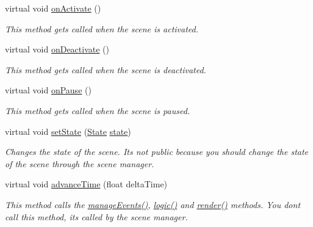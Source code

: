 \begin{DoxyCompactItemize}
\item 
virtual void \hyperlink{classzt_1_1_scene_a45f434d305b61e9819fb21efe35189dc}{on\+Activate} ()
\begin{DoxyCompactList}\small\item\em This method gets called when the scene is activated. \end{DoxyCompactList}\item 
virtual void \hyperlink{classzt_1_1_scene_a58390d4649c7c0eda1a3fe2f65952a3f}{on\+Deactivate} ()
\begin{DoxyCompactList}\small\item\em This method gets called when the scene is deactivated. \end{DoxyCompactList}\item 
virtual void \hyperlink{classzt_1_1_scene_a38821456606a61abb6255fed9954336e}{on\+Pause} ()
\begin{DoxyCompactList}\small\item\em This method gets called when the scene is paused. \end{DoxyCompactList}\item 
virtual void \hyperlink{classzt_1_1_scene_a0a0d32e948aca8f581a771f54a4444e5}{set\+State} (\hyperlink{classzt_1_1_scene_a5618d9448cd874af20a6be8ed60c87a5}{State} \hyperlink{classzt_1_1_scene_afa7ec29518dcf41daf6e1b33b3241ff8}{state})
\begin{DoxyCompactList}\small\item\em Changes the state of the scene. It\textquotesingle{}s not public because you should change the state of the scene through the scene manager. \end{DoxyCompactList}\item 
virtual void \hyperlink{classzt_1_1_scene_ac5440bbe62a44eda2d4b3d1dde5d3d6a}{advance\+Time} (float delta\+Time)
\begin{DoxyCompactList}\small\item\em This method calls the \hyperlink{classzt_1_1_scene_ac450fd3460c158c0a3f2661df0410477}{manage\+Events()}, \hyperlink{classzt_1_1_scene_a1150eb60893f3077ecacf94b309414bf}{logic()} and \hyperlink{classzt_1_1_scene_aa554c0468228aa1aab7e553c52c7b0d4}{render()} methods. You don\textquotesingle{}t call this method, it\textquotesingle{}s called by the scene manager. \end{DoxyCompactList}\item 
\mbox{\label{classzt_1_1_scene_ac450fd3460c158c0a3f2661df0410477}} 

\end{DoxyCompactItemize}
